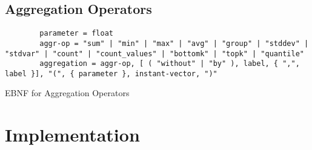 \subsection{Aggregation Operators}

\begin{listing}[H]
	\begin{samepage}
		\begin{verbatim}
		parameter = float
		aggr-op = "sum" | "min" | "max" | "avg" | "group" | "stddev" | "stdvar" | "count" | "count_values" | "bottomk" | "topk" | "quantile"
		aggregation = aggr-op, [ ( "without" | "by" ), label, { ",", label }], "(", { parameter }, instant-vector, ")"
		\end{verbatim}
		\caption{EBNF for Aggregation Operators}
	\end{samepage}
\end{listing}

\clearpage
\section{Implementation}
